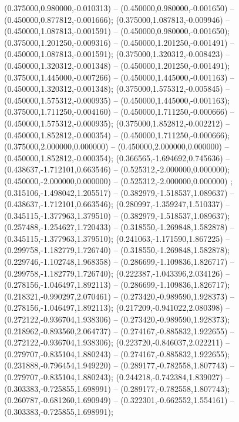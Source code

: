  (0.375000,0.980000,-0.010313) -- (0.450000,0.980000,-0.001650) -- (0.450000,0.877812,-0.001666);
 (0.375000,1.087813,-0.009946) -- (0.450000,1.087813,-0.001591) -- (0.450000,0.980000,-0.001650);
 (0.375000,1.201250,-0.009316) -- (0.450000,1.201250,-0.001491) -- (0.450000,1.087813,-0.001591);
 (0.375000,1.320312,-0.008423) -- (0.450000,1.320312,-0.001348) -- (0.450000,1.201250,-0.001491);
 (0.375000,1.445000,-0.007266) -- (0.450000,1.445000,-0.001163) -- (0.450000,1.320312,-0.001348);
 (0.375000,1.575312,-0.005845) -- (0.450000,1.575312,-0.000935) -- (0.450000,1.445000,-0.001163);
 (0.375000,1.711250,-0.004160) -- (0.450000,1.711250,-0.000666) -- (0.450000,1.575312,-0.000935);
 (0.375000,1.852812,-0.002212) -- (0.450000,1.852812,-0.000354) -- (0.450000,1.711250,-0.000666);
 (0.375000,2.000000,0.000000) -- (0.450000,2.000000,0.000000) -- (0.450000,1.852812,-0.000354);
 (0.366565,-1.694692,0.745636) -- (0.438637,-1.712101,0.663546) -- (0.525312,-2.000000,0.000000);
 (0.450000,-2.000000,0.000000) -- (0.525312,-2.000000,0.000000) ;
 (0.315106,-1.498042,1.205517) -- (0.382979,-1.518537,1.089637) -- (0.438637,-1.712101,0.663546);
 (0.280997,-1.359247,1.510337) -- (0.345115,-1.377963,1.379510) -- (0.382979,-1.518537,1.089637);
 (0.257488,-1.254627,1.720433) -- (0.318550,-1.269848,1.582878) -- (0.345115,-1.377963,1.379510);
 (0.241063,-1.171590,1.867225) -- (0.299758,-1.182779,1.726740) -- (0.318550,-1.269848,1.582878);
 (0.229746,-1.102748,1.968358) -- (0.286699,-1.109836,1.826717) -- (0.299758,-1.182779,1.726740);
 (0.222387,-1.043396,2.034126) -- (0.278156,-1.046497,1.892113) -- (0.286699,-1.109836,1.826717);
 (0.218321,-0.990297,2.070461) -- (0.273420,-0.989590,1.928373) -- (0.278156,-1.046497,1.892113);
 (0.217209,-0.941022,2.080398) -- (0.272122,-0.936704,1.938306) -- (0.273420,-0.989590,1.928373);
 (0.218962,-0.893560,2.064737) -- (0.274167,-0.885832,1.922655) -- (0.272122,-0.936704,1.938306);
 (0.223720,-0.846037,2.022211) -- (0.279707,-0.835104,1.880243) -- (0.274167,-0.885832,1.922655);
 (0.231888,-0.796454,1.949220) -- (0.289177,-0.782558,1.807743) -- (0.279707,-0.835104,1.880243);
 (0.244218,-0.742384,1.839027) -- (0.303383,-0.725855,1.698991) -- (0.289177,-0.782558,1.807743);
 (0.260787,-0.681260,1.690949) -- (0.322301,-0.662552,1.554161) -- (0.303383,-0.725855,1.698991);
